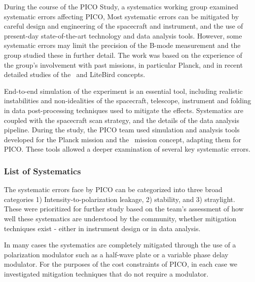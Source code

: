 \documentclass[PICOReport.tex]{subfiles}
\begin{document}
During the course of the PICO Study, a systematics working group
examined systematic errors affecting PICO,
Most  systematic errors can be mitigated by careful design and engineering of 
the spacecraft and instrument, and the use of present-day state-of-the-art
technology and data analysis tools.   
However, some systematic errors may
limit the precision of the B-mode measurement and the group studied
these in further detail. 
The work was based on the experience of the group's involvement with
past missions, in particular Planck, and in recent detailed studies of 
the \core\ and LiteBird  concepts.

End-to-end simulation of the experiment is an essential tool,
including realistic instabilities and non-idealities of the spacecraft,
telescope, instrument and folding in data post-processing techniques
used to mitigate the effects.  Systematics are coupled with the
spacecraft scan strategy, and the details of the 
data analysis pipeline.  During the study, the PICO team used 
 simulation and analysis tools developed for the Planck mission\cite{plank2015_xii_focalplane} and 
the \core\ mission concept, adapting them for PICO.  These tools allowed
a deeper examination of several key systematic errors. 

\subsubsection{List of Systematics}
The systematic errors face by PICO can be categorized into three broad categories 
1) Intensity-to-polarization leakage, 2) stability, and 3)
straylight.    These were prioritized for further study based on the
team's assessment of how well these systematics are understood by the
community, whether mitigation techniques exist - either in instrument
design or in data analysis.

In many cases the systematics are completely mitigated through the use of a polarization modulator such as a half-wave plate or a variable phase delay modulator.  
For the purposes of the cost constraints of PICO, in each case we investigated mitigation techniques that do not require a modulator.
\end{document}
